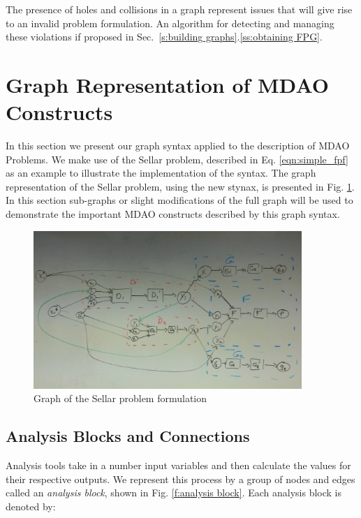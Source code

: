  The presence of holes and collisions in a graph represent issues that will give
  rise to an invalid problem formulation. An algorithm for detecting and 
  managing these violations if proposed in Sec.~\ref{s:building graphs}.\ref{ss:obtaining FPG}.

\section{Graph Representation of MDAO Constructs}
\label{s:graph representation}
In this section we present our graph syntax applied to the description of MDAO 
Problems. We make use of the Sellar problem, described in 
Eq. \ref{eqn:simple_fpf} as an example to illustrate the implementation of the syntax. 
The graph representation of the Sellar problem, using the new stynax, is 
presented in Fig. \ref{f:sellar_graph_full}. In this section sub-graphs or 
slight modifications of the full graph will be used to demonstrate the 
important MDAO constructs described by this graph syntax.

\begin{figure}[htb!]
    \begin{center}
    \includegraphics[width=4in]{images/sellar_graph_full}
    \end{center}
    \vspace{-10pt}
\caption{Graph of the Sellar problem formulation}
\label{f:sellar_graph_full}
\end{figure}

\subsection{Analysis Blocks and Connections}
\label{ss:analysis blocks and connections}
Analysis tools take in a number input variables and then calculate 
the values for their respective outputs. We represent this process
by a group of nodes and edges called an \emph{analysis block}, 
shown in Fig. \ref{f:analysis block}. Each analysis block is 
denoted by: 

